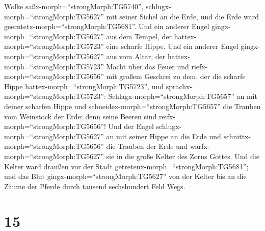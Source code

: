 Wolke saßx-morph=``strongMorph:TG5740'',
schlugx-morph=``strongMorph:TG5627'' mit seiner Sichel an die Erde, und
die Erde ward geerntetx-morph=``strongMorph:TG5681''.  Und
ein anderer Engel gingx-morph=``strongMorph:TG5627'' aus dem Tempel, der
hattex-morph=``strongMorph:TG5723'' eine scharfe Hippe. 
Und ein anderer Engel gingx-morph=``strongMorph:TG5627'' aus vom Altar,
der hattex-morph=``strongMorph:TG5723'' Macht über das Feuer und
riefx-morph=``strongMorph:TG5656'' mit großem Geschrei zu dem, der die
scharfe Hippe hattex-morph=``strongMorph:TG5723'', und
sprachx-morph=``strongMorph:TG5723'':
Schlagx-morph=``strongMorph:TG5657'' an mit deiner scharfen Hippe und
schneidex-morph=``strongMorph:TG5657'' die Trauben vom Weinstock der
Erde; denn seine Beeren sind reifx-morph=``strongMorph:TG5656''!
 Und der Engel schlugx-morph=``strongMorph:TG5627'' an mit
seiner Hippe an die Erde und schnittx-morph=``strongMorph:TG5656'' die
Trauben der Erde und warfx-morph=``strongMorph:TG5627'' sie in die große
Kelter des Zorns Gottes.  Und die Kelter ward draußen vor
der Stadt getretenx-morph=``strongMorph:TG5681''; und das Blut
gingx-morph=``strongMorph:TG5627'' von der Kelter bis an die Zäume der
Pferde durch tausend sechshundert Feld Wegs.

\hypertarget{section-14}{%
\section{15}\label{section-14}}

